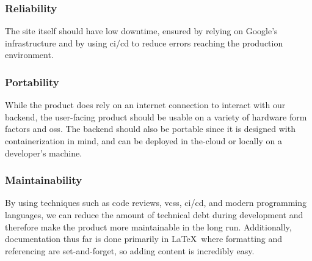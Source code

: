         \subsubsection{Reliability}
            The site itself should have low downtime, ensured by relying on Google's infrastructure and by using \gls{ci}/\gls{cd} to reduce errors reaching the production environment. 
        \subsubsection{Portability}
            While the product does rely on an internet connection to interact with our backend, the user-facing product should be usable on a variety of hardware form factors and \glspl{os}. The backend should also be portable since it is designed with containerization in mind, and can be deployed in \gls{the-cloud} or locally on a developer's machine.
        \subsubsection{Maintainability}
            By using techniques such as code reviews, \glspl{vcs}, \gls{ci}/\gls{cd}, and modern programming languages, we can reduce the amount of technical debt during development and therefore make the product more maintainable in the long run. Additionally, documentation thus far is done primarily in \LaTeX\ where formatting and referencing are set-and-forget, so adding content is incredibly easy.
